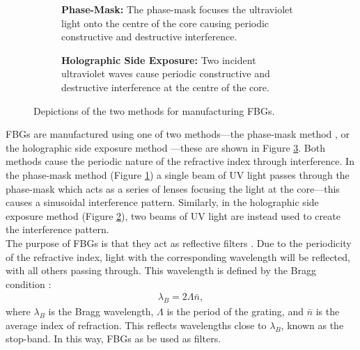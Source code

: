 \begin{figure}[p]
\centering
\begin{subfigure}{\textwidth}
\centering

\caption{\textbf{Phase-Mask:} The phase-mask focuses the ultraviolet light onto the centre of the core causing periodic constructive and destructive interference.}
\label{fig:phasemask}
\vspace{10mm}
\end{subfigure}
\begin{subfigure}{\textwidth}
\centering

\caption{\textbf{Holographic Side Exposure:} Two incident ultraviolet waves cause periodic constructive and destructive interference at the centre of the core.}
\label{fig:holographic}
\end{subfigure}
\caption{Depictions of the two methods for manufacturing FBGs.}
\label{fig:fbgmake}
\end{figure}

FBGs are manufactured using one of two methods---the phase-mask method \cite{agrawal2002, alazzawi, starodoumov}, or the holographic side exposure method \cite{agrawal2002, alazzawi, ferreira, starodoumov}---these are shown in Figure \ref{fig:fbgmake}. Both methods cause the periodic nature of the refractive index through interference. In the phase-mask method (Figure \ref{fig:phasemask}) a single beam of UV light passes through the phase-mask which acts as a series of lenses focusing the light at the core---this causes a sinusoidal interference pattern. Similarly, in the holographic side exposure method (Figure \ref{fig:holographic}), two beams of UV light are instead used to create the interference pattern. \\

The purpose of FBGs is that they act as reflective filters \cite{agrawal2002, alazzawi, ferreira, starodoumov}. Due to the periodicity of the refractive index, light with the corresponding wavelength will be reflected, with all others passing through. This wavelength is defined by the Bragg condition \cite{agrawal2002, alazzawi, ferreira, silfvast, starodoumov}:
\begin{align}
\label{eq:bragg}
\lambda_B = 2 \Lambda \bar{n},
\end{align}
where $\lambda_B$ is the Bragg wavelength, $\Lambda$ is the period of the grating, and $\bar{n}$ is the average index of refraction. This reflects wavelengths close to $\lambda_B$, known as the stop-band. In this way, FBGs as be used as filters. \\

